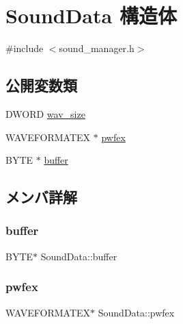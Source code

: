 \hypertarget{struct_sound_data}{}\section{Sound\+Data 構造体}
\label{struct_sound_data}


{\ttfamily \#include $<$sound\+\_\+manager.\+h$>$}

\subsection*{公開変数類}
\begin{DoxyCompactItemize}
\item 
D\+W\+O\+RD \mbox{\hyperlink{struct_sound_data_a7345591a265366527aa8f294baa28473}{wav\+\_\+size}}
\item 
W\+A\+V\+E\+F\+O\+R\+M\+A\+T\+EX $\ast$ \mbox{\hyperlink{struct_sound_data_acba05a1dec5a40da1b9eb7975b8f2960}{pwfex}}
\item 
B\+Y\+TE $\ast$ \mbox{\hyperlink{struct_sound_data_ab2ea6d6eac91ff659c5d6b93664e0c6d}{buffer}}
\end{DoxyCompactItemize}


\subsection{メンバ詳解}
\mbox{\label{struct_sound_data_ab2ea6d6eac91ff659c5d6b93664e0c6d}} 
\subsubsection{\texorpdfstring{buffer}{buffer}}
{\footnotesize\ttfamily B\+Y\+TE$\ast$ Sound\+Data\+::buffer}

\mbox{\label{struct_sound_data_acba05a1dec5a40da1b9eb7975b8f2960}} 
\subsubsection{\texorpdfstring{pwfex}{pwfex}}
{\footnotesize\ttfamily W\+A\+V\+E\+F\+O\+R\+M\+A\+T\+EX$\ast$ Sound\+Data\+::pwfex}

\mbox{\label{struct_sound_data_a7345591a265366527aa8f294baa28473}} 
